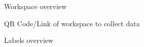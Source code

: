\begin{figure}[h]
    \centering
    \caption{Workspace overview}
    \label{fig:workspace-overview}
\end{figure}

\begin{figure}[h]
    \centering
    \caption{QR Code/Link of workspace to collect data}
    \label{fig:workspace-link}
\end{figure}

\begin{figure}[h]
    \centering
    \caption{Labels overview}
    \label{fig:labels-overview}
\end{figure}

